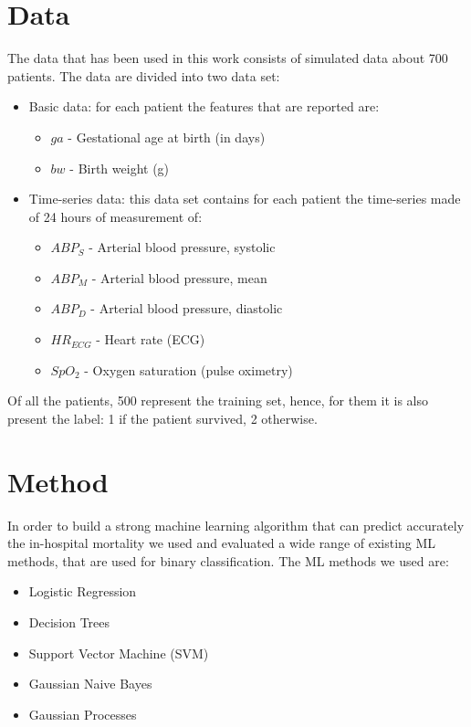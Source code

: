 \documentclass[a4paper,11pt]{article}
\begin{document}
\section{Data} %
The data that has been used in this work consists of simulated data about 700 patients. The data are divided into two data set:
\begin{itemize}
    \item Basic data: for each patient the features that are reported are:
    \begin{itemize}
        \item $ga$ - Gestational age at birth (in days)
        \item $bw$ - Birth weight (g)
    \end{itemize}
    \item Time-series data: this data set contains for each patient the time-series made of 24 hours of measurement of:
    \begin{itemize}
        \item $ABP_S$ - Arterial blood pressure, systolic
        \item $ABP_M$ - Arterial blood pressure, mean
        \item $ABP_D$ - Arterial blood pressure, diastolic
        \item $HR_{ECG}$ - Heart rate (ECG)
        \item $SpO_2$ - Oxygen saturation (pulse oximetry)
    \end{itemize}
\end{itemize}
Of all the patients, 500 represent the training set, hence, for them it is also present the label: 1 if the patient survived, 2 otherwise.

\section{Method}

In order to build a strong machine learning algorithm that can predict accurately the in-hospital mortality we used and evaluated a wide range of existing ML methods, that are used for binary classification. The ML methods we used are:

\begin{itemize}
    \item Logistic Regression
    \item Decision Trees
    \item Support Vector Machine (SVM)
    \item Gaussian Naive Bayes
    \item Gaussian Processes
\end{itemize}
\end{document}
